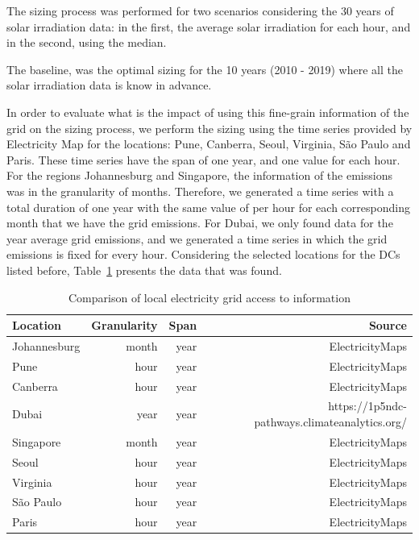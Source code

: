 The sizing process was performed for two scenarios considering the 30 years of solar irradiation data: in the first, the average solar irradiation for each hour, and in the second, using the median.

The baseline, was the optimal sizing for the 10 years (2010 - 2019) where all the solar irradiation data is know in advance.




In order to evaluate what is the impact of using this fine-grain information of the grid  on the sizing process, we perform the sizing using the time series provided by Electricity Map for the locations: Pune, Canberra, Seoul, Virginia, São Paulo and Paris. These time series have the span of one year, and one value for each hour. For the regions Johannesburg and Singapore, the information of the  emissions was in the granularity of months. Therefore, we generated a time series with a total duration of one year with the same value of  per hour for each corresponding month that we have the grid  emissions. For Dubai, we only found data for the year average grid  emissions, and we generated a time series in which the grid emissions is fixed for every hour. Considering the selected locations for the DCs listed before, Table~\ref{tab:grid_emissions_hist} presents the data that was found.

\begin{table}[H]
  
\caption{Comparison of local electricity grid access to information }\label{tab:grid_emissions_hist} \centering
  
  \begin{tabular}{|l|r|r|r|}
  \hline
    
  \textbf{Location} &   \textbf{Granularity} & \textbf{Span} & \textbf{Source} \\
  \hline
  Johannesburg & month & year & ElectricityMaps  \\
  \hline
  Pune  & hour & year & ElectricityMaps  \\
  \hline
  Canberra  & hour &  year & ElectricityMaps \\
  \hline
  Dubai    & year & year & https://1p5ndc-pathways.climateanalytics.org/  \\
  \hline
  Singapore & month & year & ElectricityMaps \\
  \hline     
  Seoul     & hour & year & ElectricityMaps \\
  \hline
  Virginia  &  hour & year & ElectricityMaps \\
  \hline
  São Paulo & hour & year  & ElectricityMaps \\
  \hline 
  Paris     & hour & year  & ElectricityMaps  \\
  \hline


\end{tabular}  
\end{table}

